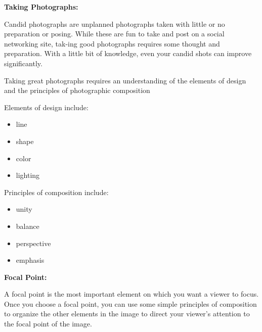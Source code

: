 \documentclass{report}
\begin{document}
    \bigbreak \noindent \bigbreak \noindent 
    \begin{Large}
        \textbf{Taking Photographs:}
    \end{Large}

    \bigbreak \noindent 
    Candid photographs are unplanned photographs taken with little or no preparation or posing. While these are fun to take and post on a social networking site, tak-ing good photographs requires some thought and preparation. With a little bit of knowledge, even your candid shots can improve significantly.

    \bigbreak \noindent 
    Taking great photographs requires an understanding of the elements of design and the principles of photographic composition

    \bigbreak \noindent 
    Elements of design include:

    \bigbreak \noindent 
    \begin{itemize}
        \item line
        \item shape
        \item color
        \item lighting
    \end{itemize}

    \bigbreak \noindent 
    Principles of composition include:

    \bigbreak \noindent 
    \begin{itemize}
        \item unity
        \item balance
        \item perspective
        \item emphasis
    \end{itemize}

    \bigbreak \noindent 

    \bigbreak \noindent \bigbreak \noindent 
    \begin{Large}
        \textbf{Focal Point:}
    \end{Large}

    \bigbreak \noindent 
    A focal point is the most important element on which you want a viewer to focus. Once you choose a focal point, you can use some simple principles of composition to organize the other elements in the image to direct your viewer’s attention to the focal point of the image.
\end{document}
